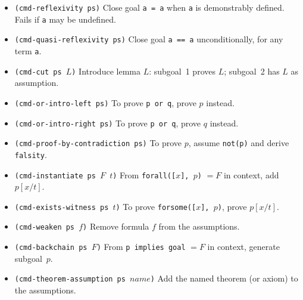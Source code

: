 \begin{itemize}
\begin{VNBcode}
;;; Commutative expansion:
(sp (make-wff-from-string
  "forall([x in ZZ, y in ZZ], (x+y)*(x+y) = x*x + 2*x*y + y*y)"))
(crs)
  \end{VNBcode}

  The procedure is a trusted oracle (it compares canonical normal forms
  rather than mechanising the ring properties), carrying the warrant
  \texttt{comm-ring-simplify} of kind \texttt{well-known}.  The primitive
  inference is \texttt{pi-comm-ring-simplify!} in
  \texttt{comm-ring-simplify.scm}.  The interactive short form is
  \texttt{(crs)}.

\item \texttt{(cmd-reflexivity ps)}
  Close goal \texttt{a = a} when \texttt{a} is demonstrably defined.
  Fails if \texttt{a} may be undefined.

\item \texttt{(cmd-quasi-reflexivity ps)}
  Close goal \texttt{a == a} unconditionally, for any term \texttt{a}.

\item \texttt{(cmd-cut ps $L$)}
  Introduce lemma $L$: subgoal~1 proves $L$; subgoal~2 has $L$ as assumption.

\item \texttt{(cmd-or-intro-left ps)}
  To prove \texttt{p or q}, prove $p$ instead.

\item \texttt{(cmd-or-intro-right ps)}
  To prove \texttt{p or q}, prove $q$ instead.

\item \texttt{(cmd-proof-by-contradiction ps)}
  To prove $p$, assume \texttt{not(p)} and derive \texttt{falsity}.

\item \texttt{(cmd-instantiate ps $F$\ $t$)}
  From \texttt{forall([$x$], $p$)} $= F$ in context, add $p[x/t]$.

\item \texttt{(cmd-exists-witness ps $t$)}
  To prove \texttt{forsome([$x$], $p$)}, prove $p[x/t]$.

\item \texttt{(cmd-weaken ps $f$)}
  Remove formula $f$ from the assumptions.

\item \texttt{(cmd-backchain ps $F$)}
  From \texttt{p implies goal} $= F$ in context, generate subgoal~$p$.

\item \texttt{(cmd-theorem-assumption ps $\mathit{name}$)}
  Add the named theorem (or axiom) to the assumptions.


\end{itemize}
